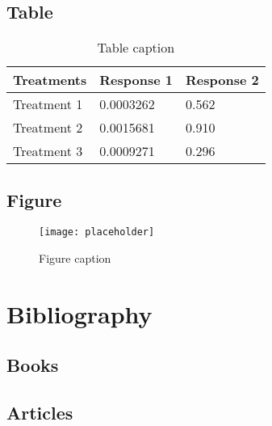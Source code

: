 \documentclass[11pt,fleqn]{book} %
\begin{document}
\section{Table}

\begin{table}[h]
\centering
\begin{tabular}{l l l}
\toprule
\textbf{Treatments} & \textbf{Response 1} & \textbf{Response 2}\\
\midrule
Treatment 1 & 0.0003262 & 0.562 \\
Treatment 2 & 0.0015681 & 0.910 \\
Treatment 3 & 0.0009271 & 0.296 \\
\bottomrule
\end{tabular}
\caption{Table caption}
\end{table}


\section{Figure}

\begin{figure}[h]
\centering\texttt{[image: placeholder]}
\caption{Figure caption}
\end{figure}


\chapter*{Bibliography}
\section*{Books}
\section*{Articles}


\cleardoublepage
{}
\setlength{\columnsep}{0.75cm}
\printindex

\end{document}
